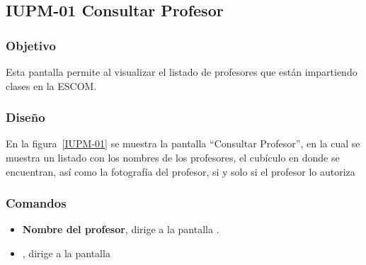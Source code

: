 \subsection{IUPM-01  Consultar  Profesor}

\subsubsection{Objetivo}

	
    Esta pantalla permite al  visualizar el listado de profesores que están impartiendo clases en la ESCOM.
\subsubsection{Diseño}


    En la figura~\ref{IUPM-01} se muestra la pantalla ``Consultar Profesor'', en la cual se muestra un listado con los nombres de los profesores, el cubículo en donde se encuentran, así como la fotografía del profesor, si y solo si el profesor lo autoriza 



\subsubsection{Comandos}
    \begin{itemize}

	\item \textbf{Nombre del profesor}, dirige a la pantalla .
	\item {}, dirige a la pantalla 
    \end{itemize}

